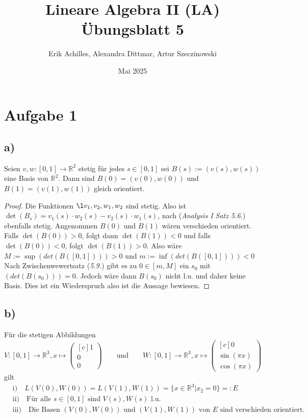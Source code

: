 \documentclass{article}
\title{Lineare Algebra II (LA) Übungsblatt 5}
\author{Erik Achilles, Alexandra Dittmar, Artur Szeczinowski}
\date{Mai 2025}
\newcommand{\RR}{\mathbb{R}}
\newcommand{\vect}[1]{\begin{pmatrix*}[c] #1 \end{pmatrix*}}
\begin{document}
\section*{Aufgabe 1}

\subsection*{a)}
Seien $v,w : [0, 1] \to \RR^2$ stetig für jedes
$s \in [0,1]$ sei $B(s) := (v(s), w(s))$ eine Basis
von $\RR^2$. Dann sind $B(0) = (v(0), w(0))$ und
$B(1) = (v(1), w(1))$ gleich orientiert.

\begin{proof}
  Die Funktionen $\l v_1, v_2, w_1, w_2$ sind stetig.
  Also ist $\det(B_s) = v_1(s) \cdot w_2(s)
  - v_2(s) \cdot w_1(s)$, nach (\textit{Analysis I Satz 5.6.})
  ebenfalls stetig. 
  Angenommen $B(0)$ und $B(1)$ wären verschieden orientiert.
  Falls $\det(B(0)) > 0$, folgt dann $\det(B(1)) < 0$ und 
  falls $\det(B(0)) < 0$, folgt $\det(B(1)) > 0$.
  Also wäre $M := \sup(det(B([0,1]))) > 0$ und
  $m :=\inf(det(B([0,1]))) < 0$
  Nach Zwischenwewertsatz (\textit{5.9.}) gibt es zu
  $0 \in [m,M]$ ein $s_0$ mit $(det(B(s_0))) = 0$.
  Jedoch wäre dann $B(s_0)$ nicht l.u. und daher keine Basis.
  Dies ist ein Wiederspruch also ist die Aussage bewiesen.
\end{proof}



\subsection*{b)}
Für die stetigen Abbildungen
$$
V: [0,1] \to \RR^3, x \mapsto \vect{1 \\ 0 \\ 0}
\qquad\text{und}\qquad
W: [0,1] \to \RR^3, x \mapsto \vect{0 \\ \sin(\pi x) \\ \cos(\pi x)}
$$
gilt
\begin{align*}
  &\text{i)} \quad L(V(0), W(0)) = L(V (1), W(1)) = \{ x \in \RR^3 | x_2 = 0 \} =: E\\
  &\text{ii)} \quad \text{Für alle $s \in [0,1]$ sind $V(s),W(s)$ l.u.}\\
  &\text{iii)} \quad \text{Die Basen $(V(0),W(0))$ und $(V(1),W(1))$ von $E$ sind verschieden orientiert.}
\end{align*}
\end{document}
